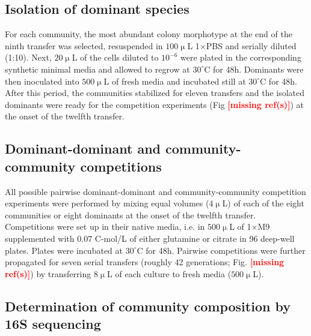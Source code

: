 \documentclass[a4paper,10pt]{article}
\newcommand{\mr}{\textcolor{red}{\textbf{[missing ref(s)]}}}
\begin{document}
\subsection*{Isolation of dominant species}\label{methods:dominants}

For each community, the most abundant colony morphotype at the end of the ninth transfer
was selected, resuspended in $100\upmu$L 1$\times$PBS and serially diluted (1:10).
Next, $20\upmu$L of the cells diluted to $10^{-6}$ were plated in the corresponding synthetic
minimal media and allowed to regrow at $30^\circ$C for 48h. Dominants were then inoculated
into $500\upmu$L of fresh media and incubated still at $30^\circ$C for 48h.
After this period, the communities stabilized for eleven transfers and the isolated dominants
were ready for the competition experiments (Fig \mr) at the onset of the twelfth transfer.

\subsection*{Dominant-dominant and community-community competitions}
\label{methods:competitions}

All possible pairwise dominant-dominant and community-community
competition experiments
were performed by mixing equal volumes ($4\upmu$L) of each of the eight
communities or eight dominants at the onset of the twelfth transfer.
Competitions were set up in their native media,
i.e. in $500\upmu$L of 1$\times$M9 supplemented with 0.07 C-mol/L of
either glutamine or citrate in 96 deep-well plates.
Plates were incubated at $30^\circ$C for 48h.
Pairwise competitions were further propagated for seven serial transfers
(roughly 42 generations; Fig. \mr) by transferring $8\upmu$L of
each culture to fresh media ($500\upmu$L).

\subsection*{Determination of community composition by 16S sequencing}
\label{methods:sequencing}
\end{document}
